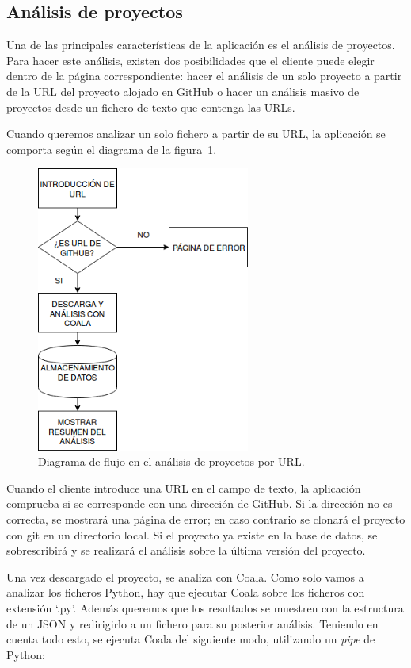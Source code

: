 \documentclass[a4paper, 12pt]{book}
\begin{document}
\subsection{Análisis de proyectos}
\label{sec:seccion12.1}
Una de las principales características de la aplicación es el análisis de proyectos. Para hacer este análisis, existen dos posibilidades que el cliente puede elegir dentro de la página correspondiente: hacer el análisis de un solo proyecto a partir de la URL del proyecto alojado en GitHub o hacer un análisis masivo de proyectos desde un fichero de texto que contenga las URLs.

Cuando queremos analizar un solo fichero a partir de su URL, la aplicación se comporta según el diagrama de la figura~\ref{fig:AnalizarURL}.
\begin{figure}[H]
  \centering
  \includegraphics[width=7cm, keepaspectratio]{img/AnalizarURL}
  \caption{Diagrama de flujo en el análisis de proyectos por URL.}
  \label{fig:AnalizarURL}
\end{figure}
Cuando el cliente introduce una URL en el campo de texto, la aplicación comprueba si se corresponde con una dirección de GitHub. Si la dirección no es correcta, se mostrará una página de error; en caso contrario se clonará el proyecto con git en un directorio local. Si el proyecto ya existe en la base de datos, se sobrescribirá y se realizará el análisis sobre la última versión del proyecto.

Una vez descargado el proyecto, se analiza con Coala. Como solo vamos a analizar los ficheros Python, hay que ejecutar Coala sobre los ficheros con extensión `.py'. Además queremos que los resultados se muestren con la estructura de un JSON y redirigirlo a un fichero para su posterior análisis. Teniendo en cuenta todo esto, se ejecuta Coala del siguiente modo, utilizando un \emph{pipe} de Python:
\end{document}
